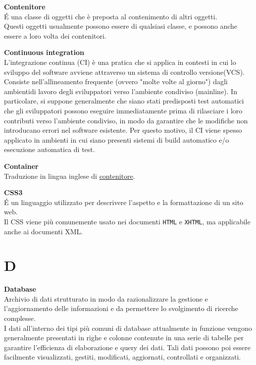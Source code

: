 \documentclass[a4paper, oneside, openany, dvipsnames, table, 12pt]{article}
\begin{document}
\label{par:container}
\textbf{Contenitore} \\
\'E una classe di oggetti che è preposta al contenimento di altri oggetti. \\ 
Questi oggetti usualmente possono essere di qualsiasi classe, e possono anche essere a loro volta dei contenitori.

\textbf{Continuous integration} \\
L'integrazione continua (CI) è una pratica che si applica in contesti in cui lo sviluppo del software avviene attraverso un sistema di controllo versione\glo (VCS\glo). Consiste nell'allineamento frequente (ovvero "molte volte al giorno") dagli ambienti\glo di lavoro degli sviluppatori verso l'ambiente condiviso (mainline).
In particolare, si suppone generalmente che siano stati predisposti test automatici che gli sviluppatori possono eseguire immediatamente prima di rilasciare i loro contributi verso l'ambiente condiviso, in modo da garantire che le modifiche non introducano errori nel software esistente. Per questo motivo, il CI viene spesso applicato in ambienti in cui siano presenti sistemi di build automatico e/o esecuzione automatica di test.


\textbf{Container} \\
Traduzione in lingua inglese di \hyperref[par:container]{contenitore\glo}.

\label{par:css3}
\textbf{CSS3} \\
\'E un linguaggio utilizzato per descrivere l’aspetto e la formattazione di un sito web. \\
Il CSS viene più comunemente usato nei documenti \texttt{HTML} e \texttt{XHTML}, ma applicabile anche ai documenti XML. 

\newpage
\section{D}
\label{par:db}
\textbf{Database} \\
Archivio di dati strutturato in modo da razionalizzare la gestione e l'aggiornamento delle informazioni e da permettere lo svolgimento di ricerche complesse. \\
I dati all'interno dei tipi più comuni di database attualmente in funzione vengono generalmente presentati in righe e colonne contenute in una serie di tabelle per garantire l'efficienza di elaborazione e query dei dati. Tali dati possono poi essere facilmente visualizzati, gestiti, modificati, aggiornati, controllati e organizzati.
\end{document}
